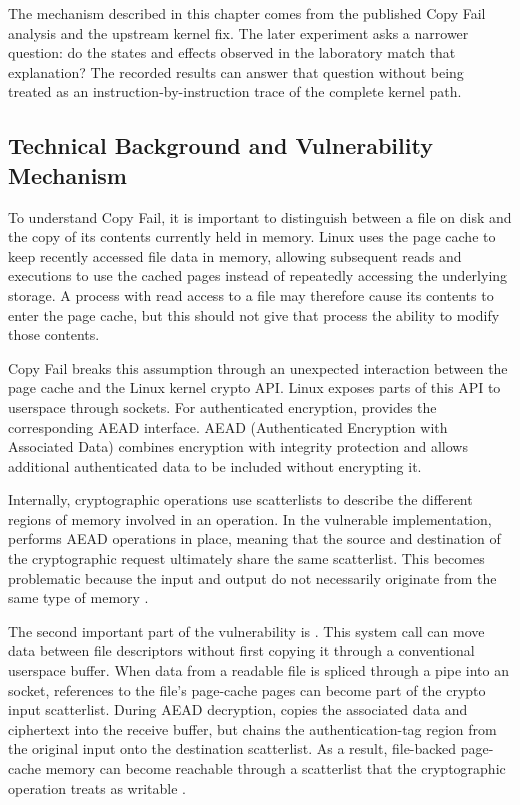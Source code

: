 The mechanism described in this chapter comes from the published Copy Fail
analysis and the upstream kernel fix. The later experiment asks a narrower
question: do the states and effects observed in the laboratory match that
explanation? The recorded results can answer that question without being
treated as an instruction-by-instruction trace of the complete kernel path.

\subsection{Technical Background and Vulnerability Mechanism}

To understand Copy Fail, it is important to distinguish between a file on disk
and the copy of its contents currently held in memory. Linux uses the page
cache to keep recently accessed file data in memory, allowing subsequent reads
and executions to use the cached pages instead of repeatedly accessing the
underlying storage. A process with read access to a file may therefore cause
its contents to enter the page cache, but this should not give that process the
ability to modify those contents.

Copy Fail breaks this assumption through an unexpected interaction between the
page cache and the Linux kernel crypto API. Linux exposes parts of this API to
userspace through  sockets. For authenticated encryption,
 provides the corresponding AEAD interface. AEAD
(Authenticated Encryption with Associated Data) combines encryption with
integrity protection and allows additional authenticated data to be included
without encrypting it.

Internally, cryptographic operations use scatterlists to describe the different
regions of memory involved in an operation. In the vulnerable implementation,
 performs AEAD operations in place, meaning that the source
and destination of the cryptographic request ultimately share the same
scatterlist. This becomes problematic because the input and output do not
necessarily originate from the same type of memory
\cite{copyfail-research,linux-copyfail-fix}.

The second important part of the vulnerability is . This system
call can move data between file descriptors without first copying it through a
conventional userspace buffer. When data from a readable file is spliced through
a pipe into an  socket, references to the file's page-cache pages
can become part of the crypto input scatterlist. During AEAD decryption,
 copies the associated data and ciphertext into the receive
buffer, but chains the authentication-tag region from the original input onto
the destination scatterlist. As a result, file-backed page-cache memory can
become reachable through a scatterlist that the cryptographic operation treats
as writable \cite{copyfail-research}.

